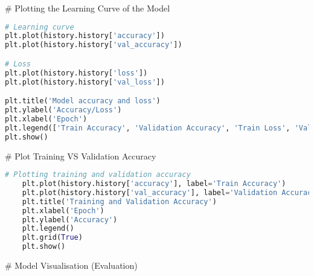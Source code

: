# Plotting the Learning Curve of the Model
\begin{lstlisting}[language=Python]
    # Learning curve
plt.plot(history.history['accuracy'])
plt.plot(history.history['val_accuracy'])

# Loss
plt.plot(history.history['loss'])
plt.plot(history.history['val_loss'])

plt.title('Model accuracy and loss')
plt.ylabel('Accuracy/Loss')
plt.xlabel('Epoch')
plt.legend(['Train Accuracy', 'Validation Accuracy', 'Train Loss', 'Validation Loss'], loc='upper left')
plt.show()
\end{lstlisting}


# Plot Training VS Validation Accuracy
\begin{lstlisting}[language=Python]
    # Plotting training and validation accuracy
    plt.plot(history.history['accuracy'], label='Train Accuracy')  
    plt.plot(history.history['val_accuracy'], label='Validation Accuracy')  
    plt.title('Training and Validation Accuracy') 
    plt.xlabel('Epoch')  
    plt.ylabel('Accuracy')  
    plt.legend()  
    plt.grid(True)  
    plt.show()  
\end{lstlisting}


# Model Visualisation (Evaluation)

